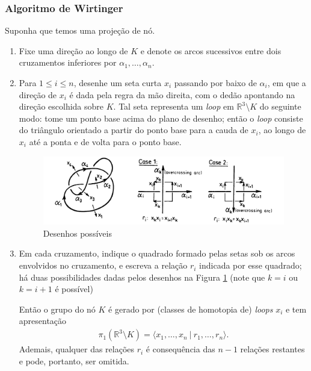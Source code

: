 	\subsubsection*{Algoritmo de Wirtinger}
	Suponha que temos uma projeção de nó.
	\begin{enumerate}
		\item Fixe uma direção ao longo de $K$ e denote os arcos sucessivos entre dois 
		cruzamentos inferiores por $\alpha_1, \dots, \alpha_n$.
		\item Para $1\leq i\leq n$, desenhe um seta curta $x_i$ passando por baixo de $\alpha_i$, 
		em que a direção de $x_i$ é dada pela regra da mão direita, com o dedão apontando na 
		direção escolhida sobre $K$. Tal seta representa um \textit{loop} em $\mathbb{R}^3\setminus K$ 
		do seguinte modo: tome um ponto base acima do plano de desenho; então o \textit{loop} 
		consiste do triângulo orientado a partir do ponto base para a cauda de $x_i$, ao 
		longo de $x_i$ até a ponta e de volta para o ponto base.
		\begin{figure}[H]
			\begin{center}
				\includegraphics[width=15cm]{Images/arcosgrupono.png}
			\end{center}\caption{Desenhos possíveis}
			\label{desenhos possiveis}
		\end{figure}
		\item Em cada cruzamento, indique o quadrado formado pelas setas sob os arcos 
		envolvidos no cruzamento, e escreva a relação $r_i$ indicada por esse quadrado; 
		há duas possibilidades dadas pelos desenhos na 
		Figura \ref{desenhos possiveis} (note que $k=i$ ou $k=i+1$ é possível)
		
		\par Então o grupo do nó $K$ é gerado por (classes de homotopia de) \textit{loops} $x_i$ 
		e tem apresentação
		\begin{align*}
    	\tag{Apresentação de Wirtinger}
    		\pi_1(\mathbb{R}^3\setminus K) = \langle x_1, \dots, x_n \ | \ r_1, \dots, r_n \rangle.
		\end{align*}
		Ademais, qualquer das relações $r_i$ é consequência das $n-1$ relações restantes e pode, portanto, ser omitida.
	\end{enumerate}
